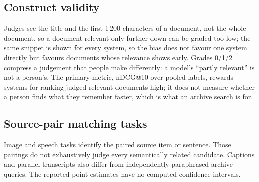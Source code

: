 \subsection{Construct validity}
Judges see the title and the first 1\,200 characters of a document, not the whole document, so a document relevant only further down can be graded too low; the same snippet is shown for every system, so the bias does not favour one system directly but favours documents whose relevance shows early. Grades 0/1/2 compress a judgement that people make differently: a model's ``partly relevant'' is not a person's. The primary metric, nDCG@10 over pooled labels, rewards systems for ranking judged-relevant documents high; it does not measure whether a person finds what they remember faster, which is what an archive search is for.

\subsection{Source-pair matching tasks}
Image and speech tasks identify the paired source item or sentence. Those pairings do not exhaustively judge every semantically related candidate. Captions and parallel transcripts also differ from independently paraphrased archive queries. The reported point estimates have no computed confidence intervals.
